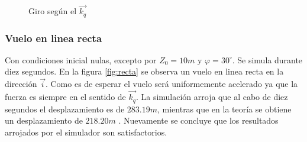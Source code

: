 \documentclass[main]{subfiles}
\begin{document}
\begin{figure} [h!]
  \centering
  \caption{Giro seg\'un el $\vec{k_q}$}
  \label{fig:hov}
\end{figure}

\subsubsection*{Vuelo en linea recta}

Con condiciones inicial nulas, excepto por $Z_0 = 10m$ y $\varphi = 30 ^{\circ}$. Se simula durante diez segundos. En la figura \ref{fig:recta} se observa un vuelo en linea recta en la direcci\'on $\vec{i}$. Como es de esperar el vuelo ser\'a uniformemente acelerado ya que la fuerza es siempre en el sentido de $\vec{k_q}$. La simulaci\'on arroja que al cabo de diez segundos el desplazamiento es de $283.19m$, mientras que en la teor\'ia se obtiene un desplazamiento de $218.20m$	. Nuevamente se concluye que los resultados arrojados por el simulador son satisfactorios.
\end{document}
